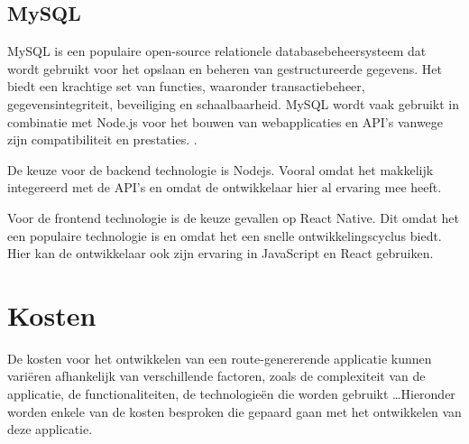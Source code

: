     \subsection{MySQL}

    MySQL is een populaire open-source relationele databasebeheersysteem dat wordt gebruikt voor het opslaan en beheren van gestructureerde gegevens.
    Het biedt een krachtige set van functies, waaronder transactiebeheer, gegevensintegriteit, beveiliging en schaalbaarheid. MySQL wordt vaak gebruikt in combinatie met Node.js voor het bouwen van webapplicaties en API's vanwege zijn compatibiliteit en prestaties. 
    \autocite{mysql_docs}.

    \break

    De keuze voor de backend technologie is Nodejs. Vooral omdat het makkelijk integereerd met de API's en omdat de ontwikkelaar hier al ervaring mee heeft.


    Voor de frontend technologie is de keuze gevallen op React Native. Dit omdat het een populaire technologie is en omdat het een snelle ontwikkelingscyclus biedt. 
    Hier kan de ontwikkelaar ook zijn ervaring in JavaScript en React gebruiken.

    \section{Kosten}

    De kosten voor het ontwikkelen van een route-genererende applicatie kunnen variëren afhankelijk van verschillende factoren, zoals de complexiteit van de applicatie, de functionaliteiten,
    de technologieën die worden gebruikt \ldots Hieronder worden enkele van de kosten besproken die gepaard gaan met het ontwikkelen van deze applicatie.







